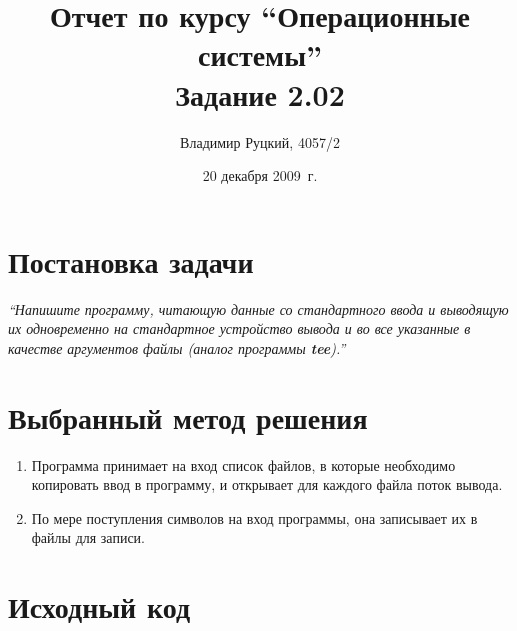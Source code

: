 \documentclass[a4paper,12pt]{article}
\title{Отчет по курсу ``Операционные системы'' \\ Задание 2.02}
\author{Владимир Руцкий, 4057/2}
\date{20 декабря 2009~г.}
\newcommand{\commandquote}[1]{\textbf{#1}}
\begin{document}
\maketitle

\section*{Постановка задачи}
\textit{``Напишите программу, читающую данные со стандартного ввода и выводящую
их одновременно на стандартное устройство вывода и во все указанные в
качестве аргументов файлы (аналог программы \commandquote{tee}).''}

\section*{Выбранный метод решения}
\begin{enumerate}
 \item Программа принимает на вход список файлов, в которые необходимо копировать ввод в программу,
и открывает для каждого файла поток вывода.
 \item По мере поступления символов на вход программы, она записывает их в файлы для записи.
\end{enumerate}

\section*{Исходный код}
\lstset{language=C, caption=task\_2\_02.c,%
label=source-code, basicstyle=\footnotesize,%
numbers=left, numberstyle=\footnotesize, numbersep=5pt, frame=single, breaklines=true, breakatwhitespace=false,%
inputencoding=utf8x}

\end{document}
